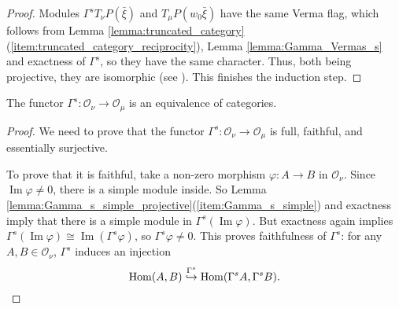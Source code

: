 \documentclass[a4paper,10pt]{article}
\begin{document}
\begin{proof}
Modules $\Gamma^s T_\nu P(\bar{\xi})$ and $T_\mu P(w_0 \bar{\xi})$ have the same Verma flag, which follows from Lemma \ref{lemma:truncated_category}(\ref{item:truncated_category_reciprocity}), Lemma \ref{lemma:Gamma_Vermas_s} and exactness of $\Gamma^s$, so they have the same character. Thus, both being projective, they are isomorphic (see \cite[3.10.]{hum}). This finishes the induction step.
\end{proof}

\begin{proposition}
The functor $\Gamma^s \colon \mathcal{O}_\nu \to \mathcal{O}_\mu$ is an equivalence of categories.
\end{proposition}
%
\begin{proof}
We need to prove that the functor $\Gamma^s \colon \mathcal{O}_\nu \to \mathcal{O}_\mu$ is full, faithful, and essentially surjective.

To prove that it is faithful, take a non-zero morphism $\varphi \colon A \to B$ in $\mathcal{O}_\nu$. Since $\operatorname{Im} \varphi \neq 0$, there is a simple module inside. So Lemma \ref{lemma:Gamma_s_simple_projective}(\ref{item:Gamma_s_simple}) and exactness imply that there is a simple module in $\Gamma^s(\operatorname{Im} \varphi)$. But exactness again implies $\Gamma^s(\operatorname{Im} \varphi) \cong \operatorname{Im}(\Gamma^s\varphi)$, so $\Gamma^s\varphi \neq 0$. This proves faithfulness of $\Gamma^s$: for any $A,B \in \mathcal{O}_\nu$, $\Gamma^s$ induces an injection
%
\begin{equation}
\label{equation:Gamma_faithful}
\mathrm{Hom}(A,B) \stackrel{\Gamma^s}{\hookrightarrow} \mathrm{Hom}(\Gamma^s A,\Gamma^s B).
\end{equation}


\end{proof}
\end{document}
